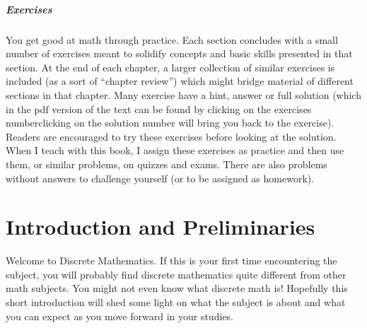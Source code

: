 \documentclass[10pt,]{book}
\theoremstyle{plain}
\theoremstyle{definition}
\theoremstyle{definition}
\numberwithin{equation}{chapter}
\begin{document}
\paragraph[{Exercises}]{Exercises}\hypertarget{paragraphs-4}{}
\hypertarget{p-18}{}%
You get good at math through practice. Each section concludes with a small number of exercises meant to solidify concepts and basic skills presented in that section. At the end of each chapter, a larger collection of similar exercises is included (as a sort of ``chapter review'') which might bridge material of different sections in that chapter. Many exercise have a hint, answer or full solution (which in the pdf version of the text can be found by clicking on the exercises number\textemdash{}clicking on the solution number will bring you back to the exercise). Readers are encouraged to try these exercises before looking at the solution. When I teach with this book, I assign these exercises as practice and then use them, or similar problems, on quizzes and exams.  There are also problems without answers to challenge yourself (or to be assigned as homework).%
\setcounter{tocdepth}{2}
\renewcommand*\contentsname{Contents}
\tableofcontents
\mainmatter
\typeout{************************************************}
\typeout{************************************************}
\chapter[{Introduction and Preliminaries}]{Introduction and Preliminaries}\label{ch_intro}
\hypertarget{p-19}{}%
Welcome to Discrete Mathematics. If this is your first time encountering the subject, you will probably find discrete mathematics quite different from other math subjects. You might not even know what discrete math is! Hopefully this short introduction will shed some light on what the subject is about and what you can expect as you move forward in your studies.%
\typeout{************************************************}
\typeout{************************************************}
\end{document}
